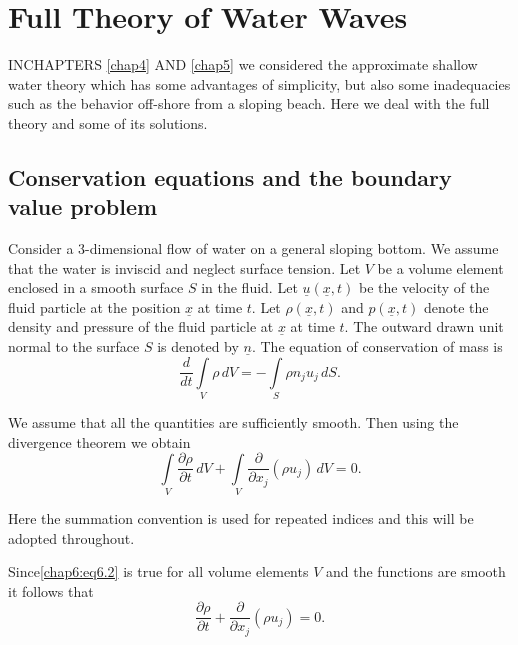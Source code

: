 
\chapter{Full Theory of Water Waves}\label{chap6}

IN\pageoriginale CHAPTERS \ref{chap4} AND \ref{chap5} we considered the approximate shallow water theory which has some advantages of simplicity, but also some inadequacies such as the behavior off-shore from a sloping beach. Here we deal with the full theory and some of its solutions.

\section{Conservation equations and the boundary value problem}\label{chap6:sec6.1}

Consider a 3-dimensional flow of water on a general sloping bottom. We assume that the water is inviscid and neglect surface tension. Let $V$ be a volume element enclosed in a smooth surface $S$ in the fluid. Let $\underline{u}(\underline{x},t)$ be the velocity of the fluid particle at the position $\underline{x}$ at time $t$. Let $\rho(\underline{x},t)$ and $p(\underline{x},t)$ denote the density and pressure of the fluid particle at $\underline{x}$ at time $t$. The outward drawn unit normal to the surface $S$ is denoted by $\underline{n}$. The equation of conservation of mass is 
\begin{equation}
\frac{d}{dt}\int\limits_V\rho\,dV=-\int\limits_S\rho n_ju_j\,dS. \tag{6.1}\label{chap6:eq6.1}
\end{equation}

We assume that all the quantities are sufficiently smooth. Then using the divergence theorem we obtain
\begin{equation}
\int\limits_V\frac{\partial\rho}{\partial t}\, dV+\int\limits_V\frac{\partial} {\partial x_j}\left(\rho u_j\right)\,dV=0.\tag{6.2}\label{chap6:eq6.2}
\end{equation}

Here the summation convention is used for repeated indices and this will be adopted throughout.

Since\pageoriginale \eqref{chap6:eq6.2} is true for all volume elements $V$ and the functions are smooth it follows that 
\begin{equation}
\frac{\partial\rho}{\partial t}+\frac{\partial}{\partial x_j}\left(\rho u_j\right)=0.\tag{6.3}\label{chap6:eq6.3}
\end{equation}

